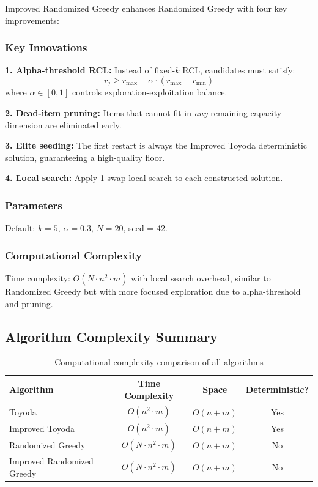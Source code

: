 \documentclass[12pt,a4paper]{article}
\begin{document}
Improved Randomized Greedy enhances Randomized Greedy with four key improvements:

\subsubsection{Key Innovations}

\textbf{1. Alpha-threshold RCL:} Instead of fixed-$k$ RCL, candidates must satisfy:
\begin{equation}
r_j \geq r_{\max} - \alpha \cdot (r_{\max} - r_{\min})
\end{equation}
where $\alpha \in [0,1]$ controls exploration-exploitation balance.

\textbf{2. Dead-item pruning:} Items that cannot fit in \emph{any} remaining capacity dimension are eliminated early.

\textbf{3. Elite seeding:} The first restart is always the Improved Toyoda deterministic solution, guaranteeing a high-quality floor.

\textbf{4. Local search:} Apply 1-swap local search to each constructed solution.

\subsubsection{Parameters}

Default: $k = 5$, $\alpha = 0.3$, $N = 20$, seed = 42.

\subsubsection{Computational Complexity}

Time complexity: $O(N \cdot n^2 \cdot m)$ with local search overhead, similar to Randomized Greedy but with more focused exploration due to alpha-threshold and pruning.

\subsection{Algorithm Complexity Summary}

\begin{table}[H]
\centering
\caption{Computational complexity comparison of all algorithms}
\label{tab:complexity}
\begin{tabular}{lccc}
\toprule
\textbf{Algorithm} & \textbf{Time Complexity} & \textbf{Space} & \textbf{Deterministic?} \\
\midrule
Toyoda & $O(n^2 \cdot m)$ & $O(n + m)$ & Yes \\
Improved Toyoda & $O(n^2 \cdot m)$ & $O(n + m)$ & Yes \\
Randomized Greedy & $O(N \cdot n^2 \cdot m)$ & $O(n + m)$ & No \\
Improved Randomized Greedy & $O(N \cdot n^2 \cdot m)$ & $O(n + m)$ & No \\
\bottomrule
\end{tabular}
\end{table}
\end{document}
